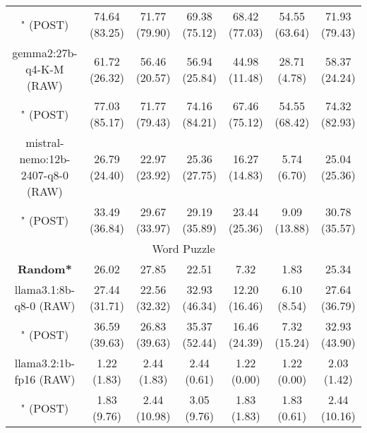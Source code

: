 \begin{table}[]
{\begin{tabular}{ccccccc}
      \multicolumn{1}{c|}{" (POST)} & 74.64 (83.25) & 71.77 (79.90) & \multicolumn{1}{c|}{69.38 (75.12)} & 68.42 (77.03) & \multicolumn{1}{c|}{54.55 (63.64)} & 71.93 (79.43) \\
      \cline{1-7}

      \multicolumn{1}{c|}{gemma2:27b-q4-K-M (RAW)} & 61.72 (26.32) & 56.46 (20.57) & \multicolumn{1}{c|}{56.94 (25.84)} & 44.98 (11.48) & \multicolumn{1}{c|}{28.71 (4.78)} & 58.37 (24.24) \\

      \multicolumn{1}{c|}{" (POST)} & 77.03 (85.17) & 71.77 (79.43) & \multicolumn{1}{c|}{74.16 (84.21)} & 67.46 (75.12) & \multicolumn{1}{c|}{54.55 (68.42)} & 74.32 (82.93) \\
      \cline{1-7}

      \multicolumn{1}{c|}{mistral-nemo:12b-2407-q8-0 (RAW)} & 26.79 (24.40) & 22.97 (23.92) & \multicolumn{1}{c|}{25.36 (27.75)} & 16.27 (14.83) & \multicolumn{1}{c|}{5.74 (6.70)} & 25.04 (25.36) \\

      \multicolumn{1}{c|}{" (POST)} & 33.49 (36.84) & 29.67 (33.97) & \multicolumn{1}{c|}{29.19 (35.89)} & 23.44 (25.36) & \multicolumn{1}{c|}{9.09 (13.88)} & 30.78 (35.57) \\
      \cline{1-7}

      \hline
      \multicolumn{7}{c}{Word Puzzle} \\ \hline
      \multicolumn{1}{c|}{\textbf{Random*}} & 26.02 & 27.85 & \multicolumn{1}{c|}{22.51} & 7.32 & \multicolumn{1}{c|}{1.83} & 25.34 \\ \hline

      \multicolumn{1}{c|}{llama3.1:8b-q8-0 (RAW)} & 27.44 (31.71) & 22.56 (32.32) & \multicolumn{1}{c|}{32.93 (46.34)} & 12.20 (16.46) & \multicolumn{1}{c|}{6.10 (8.54)} & 27.64 (36.79) \\

      \multicolumn{1}{c|}{" (POST)} & 36.59 (39.63) & 26.83 (39.63) & \multicolumn{1}{c|}{35.37 (52.44)} & 16.46 (24.39) & \multicolumn{1}{c|}{7.32 (15.24)} & 32.93 (43.90) \\
      \cline{1-7}

      \multicolumn{1}{c|}{llama3.2:1b-fp16 (RAW)} & 1.22 (1.83) & 2.44 (1.83) & \multicolumn{1}{c|}{2.44 (0.61)} & 1.22 (0.00) & \multicolumn{1}{c|}{1.22 (0.00)} & 2.03 (1.42) \\

      \multicolumn{1}{c|}{" (POST)} & 1.83 (9.76) & 2.44 (10.98) & \multicolumn{1}{c|}{3.05 (9.76)} & 1.83 (1.83) & \multicolumn{1}{c|}{1.83 (0.61)} & 2.44 (10.16) \\
      \cline{1-7}


\end{tabular}}
\end{table}
